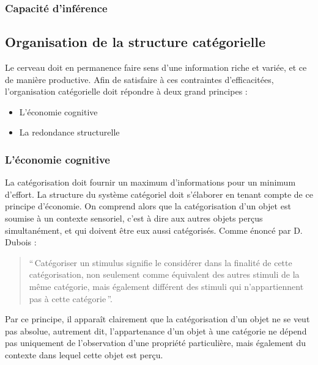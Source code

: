 \subsubsection{Capacité d'inférence}

\subsection{Organisation de la structure catégorielle}

Le cerveau doit en permanence faire sens d'une information riche et variée, et ce de manière productive. Afin de satisfaire à ces contraintes d'efficacitées, l'organisation catégorielle doit répondre à deux grand principes \citep[p. 29]{rosch1978cognition}:

\begin{itemize}
\item L'économie cognitive
\item La redondance structurelle
\end{itemize}

\subsubsection{L'économie cognitive}
La catégorisation doit fournir un maximum d'informations pour un minimum d'effort. La structure du système catégoriel doit s'élaborer en tenant compte de ce principe d'économie. On comprend alors que la catégorisation d'un objet est soumise à un contexte sensoriel, c'est à dire aux autres objets perçus simultanément, et qui doivent être eux aussi catégorisés. Comme énoncé par D. Dubois \citep[p. 33]{dubois1991semantique}:

\begin{quote}
``\,Catégoriser un stimulus signifie le considérer dans la finalité de cette catégorisation, non seulement comme équivalent des autres stimuli de la même catégorie, mais également différent des stimuli qui n'appartiennent pas à cette catégorie\,''.
\end{quote}
Par ce principe, il apparaît clairement que la catégorisation d'un objet ne se veut pas absolue, autrement dit, l'appartenance d'un objet à une catégorie ne dépend pas uniquement de l'observation d'une propriété particulière, mais également du contexte dans lequel cette objet est perçu.

